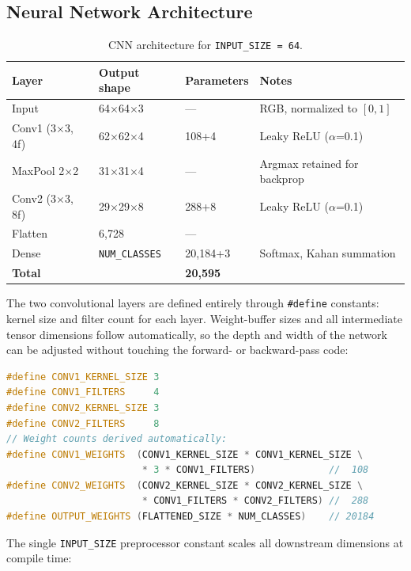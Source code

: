 \documentclass[12pt]{article}
\begin{document}
\subsection{Neural Network Architecture}
\label{subsec:nn}

\begin{table}[H]
\centering
\caption{CNN architecture for \texttt{INPUT\_SIZE = 64}.}
\label{tab:arch}
\begin{tabular}{llll}
\toprule
\textbf{Layer} & \textbf{Output shape} & \textbf{Parameters} & \textbf{Notes} \\
\midrule
Input          & 64$\times$64$\times$3  & ---     & RGB, normalized to $[0,1]$ \\
Conv1 (3$\times$3, 4f) & 62$\times$62$\times$4 & 108+4  & Leaky ReLU ($\alpha$=0.1) \\
MaxPool 2$\times$2     & 31$\times$31$\times$4 & ---    & Argmax retained for backprop \\
Conv2 (3$\times$3, 8f) & 29$\times$29$\times$8 & 288+8  & Leaky ReLU ($\alpha$=0.1) \\
Flatten        & 6{,}728               & ---     & \\
Dense          & \texttt{NUM\_CLASSES} & 20{,}184+3 & Softmax, Kahan summation \\
\midrule
\textbf{Total} & & \textbf{20{,}595} & \\
\bottomrule
\end{tabular}
\end{table}

The two convolutional layers are defined entirely through \texttt{\#define}
constants: kernel size and filter count for each layer.
Weight-buffer sizes and all intermediate tensor dimensions follow automatically,
so the depth and width of the network can be adjusted without touching the
forward- or backward-pass code:

\begin{lstlisting}[language=C++]
#define CONV1_KERNEL_SIZE 3
#define CONV1_FILTERS     4
#define CONV2_KERNEL_SIZE 3
#define CONV2_FILTERS     8
// Weight counts derived automatically:
#define CONV1_WEIGHTS  (CONV1_KERNEL_SIZE * CONV1_KERNEL_SIZE \
                        * 3 * CONV1_FILTERS)             //  108
#define CONV2_WEIGHTS  (CONV2_KERNEL_SIZE * CONV2_KERNEL_SIZE \
                        * CONV1_FILTERS * CONV2_FILTERS) //  288
#define OUTPUT_WEIGHTS (FLATTENED_SIZE * NUM_CLASSES)    // 20184
\end{lstlisting}

The single \texttt{INPUT\_SIZE} preprocessor constant scales all downstream
dimensions at compile time:
\end{document}
